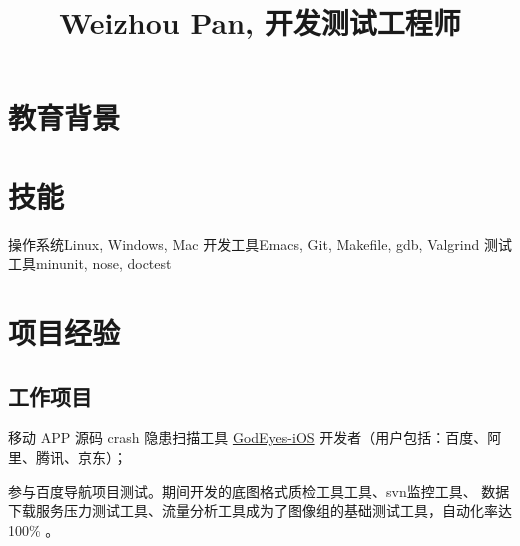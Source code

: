 \documentclass[11pt,a4paper,nolmodern]{moderncv}
\title{Weizhou Pan, 开发测试工程师}
\begin{document}
\maketitle

\vspace{-3em}

\section{\hei 教育背景}



\section{\hei 技能}

           {操作系统}{Linux, Windows, Mac}
           {开发工具}{Emacs, Git, Makefile, gdb, Valgrind}
           {测试工具}{minunit, nose, doctest}
           
\section{\hei 项目经验}


\subsection{\hei 工作项目}

{
  \begin{tightitemize}%
  \item 移动 APP 源码 crash 隐患扫描工具 \href{http://godeyes.duapp.com}{GodEyes-iOS} 开发者（用户包括：百度\texttrademark、阿里\texttrademark、腾讯\texttrademark、京东\texttrademark）；
  \item 参与百度导航项目测试。期间开发的底图格式质检工具工具、svn监控工具、
    数据下载服务压力测试工具、流量分析工具成为了图像组的基础测试工具，自动化率达 100\% 。
 \end{tightitemize}}
\end{document}
